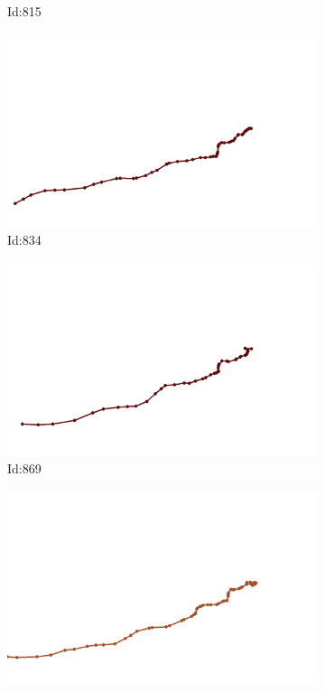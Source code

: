 \documentclass[12pt,twoside]{report}
\begin{document}
\begin{figure}
\begin{subfigure}[b]{0.20\textwidth}
\caption{Id:815}
\end{subfigure}
\begin{subfigure}[b]{0.20\textwidth}
\centering
\includegraphics[width=\textwidth]{../trajectories/834.png}
\caption{Id:834}
\end{subfigure}
\begin{subfigure}[b]{0.20\textwidth}
\centering
\includegraphics[width=\textwidth]{../trajectories/869.png}
\caption{Id:869}
\end{subfigure}
\begin{subfigure}[b]{0.20\textwidth}
\centering
\includegraphics[width=\textwidth]{../trajectories/880.png}

\end{subfigure}
\end{figure}
\end{document}
